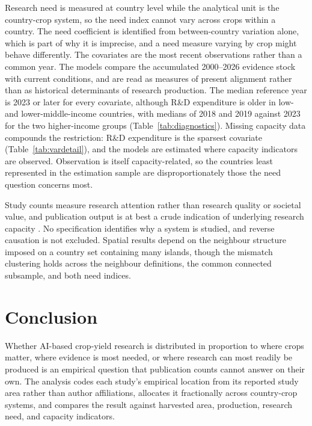 \documentclass[ASNA,twocolumn]{USG}
\begin{document}
Research need is measured at country level while the analytical unit is the country-crop
system, so the need index cannot vary across crops within a country. The need coefficient is
identified from between-country variation alone, which is part of why it is imprecise, and a
need measure varying by crop might behave differently. The covariates are the most recent observations rather than a common year. The models compare the
accumulated 2000--2026 evidence stock with current conditions, and are read as
measures of present alignment rather than as historical determinants of research production. The
median reference year is 2023 or later for every covariate, although R\&D expenditure is older in
low- and lower-middle-income countries, with medians of 2018 and 2019 against 2023 for the two
higher-income groups (Table~\ref{tab:diagnostics}). Missing capacity data compounds the restriction: R\&D expenditure
is the sparsest covariate (Table~\ref{tab:vardetail}), and the models are estimated where
capacity indicators are observed. Observation is itself capacity-related, so the countries
least represented in the estimation sample are disproportionately those the need question
concerns most.

Study counts measure research attention rather than research quality or societal value, and
publication output is at best a crude indication of underlying research capacity
\cite{CashGibson2018}. No specification identifies why a system is studied, and reverse causation is not excluded. Spatial results depend
on the neighbour structure imposed on a country set containing many islands, though the
mismatch clustering holds across the neighbour definitions, the common connected subsample,
and both need indices.

\section{Conclusion}

Whether AI-based crop-yield research is distributed in proportion to where crops matter, where
evidence is most needed, or where research can most readily be produced is an empirical
question that publication counts cannot answer on their own. The analysis codes each study's empirical location from its reported study area rather than author
affiliations, allocates it fractionally across country-crop systems, and compares the result against
harvested area, production, research need, and capacity indicators.
\end{document}
